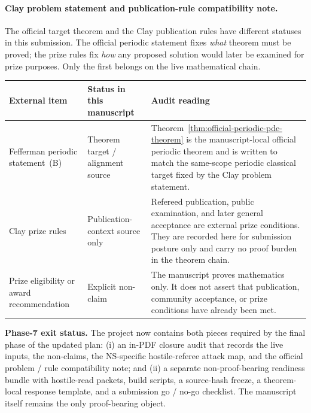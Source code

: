 \paragraph{Clay problem statement and publication-rule compatibility note.}
The official target theorem and the Clay publication rules have different statuses in this submission. The official periodic statement fixes \emph{what} theorem must be proved; the prize rules fix \emph{how} any proposed solution would later be examined for prize purposes. Only the first belongs on the live mathematical chain.

\begin{center}
\footnotesize
\renewcommand{\arraystretch}{1.14}
\setlength{\tabcolsep}{4pt}
\begin{tabularx}{0.98\textwidth}{@{}L{0.26\textwidth}L{0.25\textwidth}Y@{}}
\toprule
\textbf{External item} & \textbf{Status in this manuscript} & \textbf{Audit reading}\\
\midrule
Fefferman periodic statement~(B) \cite{fefferman-navierstokes-problem} & Theorem target / alignment source & Theorem~\ref{thm:official-periodic-pde-theorem} is the manuscript-local official periodic theorem and is written to match the same-scope periodic classical target fixed by the Clay problem statement.\\
Clay prize rules \cite{cmi-millennium-rules} & Publication-context source only & Refereed publication, public examination, and later general acceptance are external prize conditions. They are recorded here for submission posture only and carry no proof burden in the theorem chain.\\
Prize eligibility or award recommendation & Explicit non-claim & The manuscript proves mathematics only. It does not assert that publication, community acceptance, or prize conditions have already been met.\\
\bottomrule
\end{tabularx}
\end{center}

\noindent\textbf{Phase-7 exit status.} The project now contains both pieces required by the final phase of the updated plan: (i) an in-PDF closure audit that records the live inputs, the non-claims, the NS-specific hostile-referee attack map, and the official problem / rule compatibility note; and (ii) a separate non-proof-bearing readiness bundle with hostile-read packets, build scripts, a source-hash freeze, a theorem-local response template, and a submission go / no-go checklist. The manuscript itself remains the only proof-bearing object.

